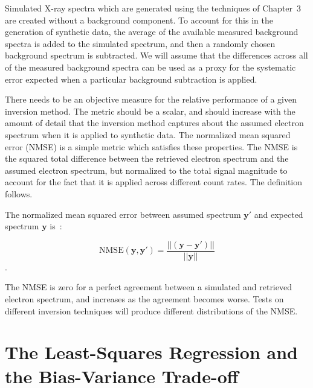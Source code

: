 Simulated X-ray spectra which are generated using the techniques of Chapter~3 are created without a background component. To account for this in the generation of synthetic data, the average of the available measured background spectra is added to the simulated spectrum, and then a randomly chosen background spectrum is subtracted. We will assume that the differences across all of the measured background spectra can be used as a proxy for the systematic error
expected when a particular background subtraction is applied. 

There needs to be an objective measure for the relative performance of a given inversion method. The metric should be a scalar, and should increase with the amount of detail that the inversion method captures about the assumed electron spectrum when it is applied to synthetic data. The normalized mean squared error (NMSE) is a simple metric which satisfies these properties. The NMSE is the squared total difference between the retrieved electron spectrum and the assumed electron spectrum, but normalized to the total signal magnitude to account for the fact that it is applied across different count rates. The definition follows.

\begin{definition}[NMSE]
The normalized mean squared error between assumed spectrum $\mathbf{y'}$ and expected spectrum $\mathbf{y}$ is~\citep{Hanha1988}: 

$$\mbox{NMSE}(\mathbf{y},\mathbf{y'}) = \frac{\vert \vert (\mathbf{y} - \mathbf{y'}) \vert \vert}{\vert \vert \mathbf{y} \vert \vert}$$.
\end{definition}

The NMSE is zero for a perfect agreement between a simulated and retrieved electron spectrum, and increases as the agreement becomes worse. Tests on different inversion techniques will produce different distributions of the NMSE.

\section{The Least-Squares Regression and the Bias-Variance Trade-off}

